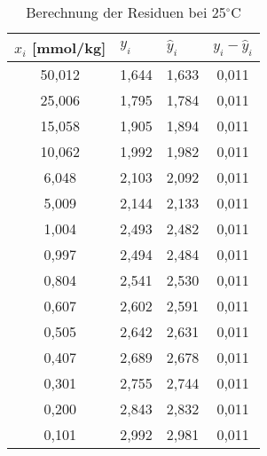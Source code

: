 \begin{table}[H]
  \centering
  \caption{Berechnung der Residuen bei 25$^\circ$C}
    \begin{tabular}{cccc}
    \toprule
    \multicolumn{1}{l}{\boldmath{}\textbf{$x_i$ [mmol/kg]}\unboldmath{}} & \multicolumn{1}{l}{\boldmath{}\textbf{$y_i$}\unboldmath{}} & \multicolumn{1}{l}{\boldmath{}\textbf{$\hat{y}_i$}\unboldmath{}} & \multicolumn{1}{l}{\boldmath{}\textbf{$y_i - \hat{y}_i$}\unboldmath{}} \\
    \midrule
    50,012 & 1,644 & 1,633 & 0,011 \\
    25,006 & 1,795 & 1,784 & 0,011 \\
    15,058 & 1,905 & 1,894 & 0,011 \\
    10,062 & 1,992 & 1,982 & 0,011 \\
    6,048 & 2,103 & 2,092 & 0,011 \\
    5,009 & 2,144 & 2,133 & 0,011 \\
    1,004 & 2,493 & 2,482 & 0,011 \\
    0,997 & 2,494 & 2,484 & 0,011 \\
    0,804 & 2,541 & 2,530 & 0,011 \\
    0,607 & 2,602 & 2,591 & 0,011 \\
    0,505 & 2,642 & 2,631 & 0,011 \\
    0,407 & 2,689 & 2,678 & 0,011 \\
    0,301 & 2,755 & 2,744 & 0,011 \\
    0,200 & 2,843 & 2,832 & 0,011 \\
    0,101 & 2,992 & 2,981 & 0,011 \\
    \bottomrule
    \end{tabular}%
  \label{tab:addlabel}%
\end{table}%
